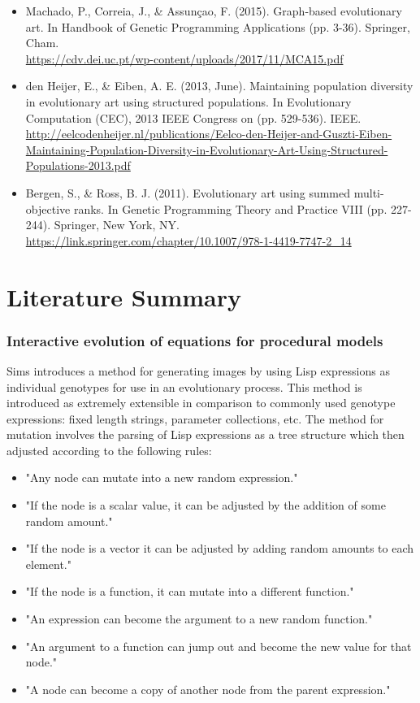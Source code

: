 \documentclass[10pt,a4paper]{article}
\begin{document}
\begin{itemize}
	\item Machado, P., Correia, J., \& Assunçao, F. (2015). Graph-based evolutionary art. In Handbook of Genetic Programming Applications (pp. 3-36). Springer, Cham.
	\\
	\url{https://cdv.dei.uc.pt/wp-content/uploads/2017/11/MCA15.pdf}
	
	\item den Heijer, E., \& Eiben, A. E. (2013, June). Maintaining population diversity in evolutionary art using structured populations. In Evolutionary Computation (CEC), 2013 IEEE Congress on (pp. 529-536). IEEE.
	\\
	\url{http://eelcodenheijer.nl/publications/Eelco-den-Heijer-and-Guszti-Eiben-Maintaining-Population-Diversity-in-Evolutionary-Art-Using-Structured-Populations-2013.pdf}
	
	\item Bergen, S., \& Ross, B. J. (2011). Evolutionary art using summed multi-objective ranks. In Genetic Programming Theory and Practice VIII (pp. 227-244). Springer, New York, NY.
	\\
	\url{https://link.springer.com/chapter/10.1007/978-1-4419-7747-2_14}
	
	
\end{itemize}

\section{Literature Summary}

\subsubsection{Interactive evolution of equations for procedural models \cite{sims}}

Sims introduces a method for generating images by using Lisp expressions as individual genotypes for use in an evolutionary process.
This method is introduced as extremely extensible in comparison to commonly used genotype expressions: fixed length strings, parameter collections, etc.
The method for mutation involves the parsing of Lisp expressions as a tree structure which then adjusted according to the following rules:

\begin{itemize}
	\item "Any node can mutate into a new random expression."
	\item "If the node is a scalar value, it can be adjusted by the addition of some random amount."
	\item "If the node is a vector it can be adjusted by adding random amounts to each element."
	\item "If the node is a function, it can mutate into a different function."
	\item "An expression can become the argument to a new random function."
	\item "An argument to a function can jump out and become the new value for that node."
	\item "A node can become a copy of another node from the parent expression."
\end{itemize}
\end{document}
